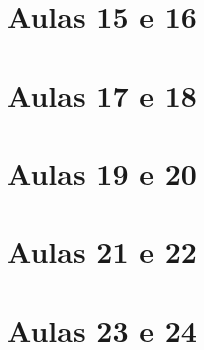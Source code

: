 \begin{apendicesenv}
    \chapter{Aulas 15 e 16} \label{ApendiceI} 
    \chapter{Aulas 17 e 18} \label{ApendiceJ} 
    \chapter{Aulas 19 e 20} \label{ApendiceK} 
    \chapter{Aulas 21 e 22} \label{ApendiceL} 
    \chapter{Aulas 23 e 24} \label{ApendiceM} 

\end{apendicesenv}
